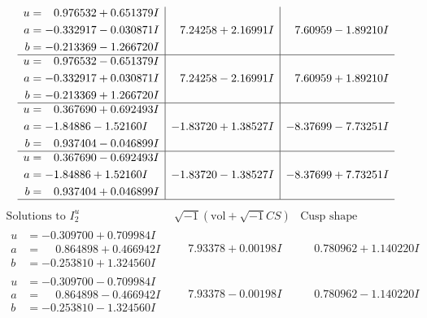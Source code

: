 \documentclass[1p]{elsarticle_modified}
\theoremstyle{definition}
\newcommand{\I}{\sqrt{-1}}
\begin{document}
$$\begin{array}{c|c|c}
\begin{aligned}
u &= \phantom{-}0.976532 + 0.651379 I \\
a &= -0.332917 - 0.030871 I \\
b &= -0.213369 - 1.266720 I\end{aligned}
 & \phantom{-}7.24258 + 2.16991 I & \phantom{-}7.60959 - 1.89210 I \\ \hline\begin{aligned}
u &= \phantom{-}0.976532 - 0.651379 I \\
a &= -0.332917 + 0.030871 I \\
b &= -0.213369 + 1.266720 I\end{aligned}
 & \phantom{-}7.24258 - 2.16991 I & \phantom{-}7.60959 + 1.89210 I \\ \hline\begin{aligned}
u &= \phantom{-}0.367690 + 0.692493 I \\
a &= -1.84886 - 1.52160 I \\
b &= \phantom{-}0.937404 - 0.046899 I\end{aligned}
 & -1.83720 + 1.38527 I & -8.37699 - 7.73251 I \\ \hline\begin{aligned}
u &= \phantom{-}0.367690 - 0.692493 I \\
a &= -1.84886 + 1.52160 I \\
b &= \phantom{-}0.937404 + 0.046899 I\end{aligned}
 & -1.83720 - 1.38527 I & -8.37699 + 7.73251 I\\
 \hline 
 \end{array}$$\newpage$$\begin{array}{c|c|c}  
\text{Solutions to }I^u_{2}& \I (\text{vol} + \sqrt{-1}CS) & \text{Cusp shape}\\
 \hline 
\begin{aligned}
u &= -0.309700 + 0.709984 I \\
a &= \phantom{-}0.864898 + 0.466942 I \\
b &= -0.253810 + 1.324560 I\end{aligned}
 & \phantom{-}7.93378 + 0.00198 I & \phantom{-}0.780962 + 1.140220 I \\ \hline\begin{aligned}
u &= -0.309700 - 0.709984 I \\
a &= \phantom{-}0.864898 - 0.466942 I \\
b &= -0.253810 - 1.324560 I\end{aligned}
 & \phantom{-}7.93378 - 0.00198 I & \phantom{-}0.780962 - 1.140220 I \\ \hline\begin{aligned}

\end{aligned}
\end{array}$$
\end{document}

